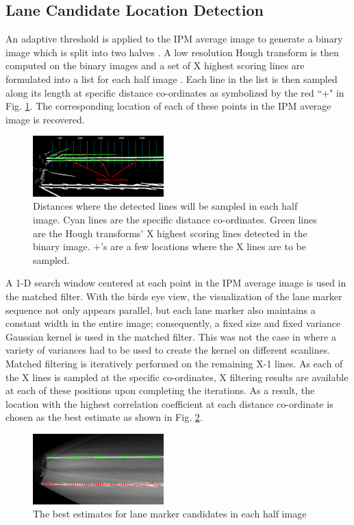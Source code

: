 \documentclass{article}
\begin{document}
\subsection{Lane Candidate Location Detection}
An adaptive threshold is applied to the IPM average image to generate a binary image which is split into two halves \cite{borkar_layered_2009}. A low resolution Hough transform is then computed on the binary images and a set of X highest scoring lines are formulated into a list for each half image \cite{borkar_layered_2009}. Each line in the list is then sampled along its length at specific distance co-ordinates as symbolized by the red ``+" in Fig. \ref{fig:sampling_points}.
The corresponding location of each of these points in the IPM average image is recovered.
\begin{figure}[htb]
  \centering
  \includegraphics[width=0.45\textwidth]{IMG/cand_lane_points.png}
  \caption{Distances where the detected lines will be sampled in each half image. Cyan lines are the specific distance co-ordinates. Green lines are the Hough transforms' X highest scoring lines detected in the binary image. +'s are a few locations where the X lines are to be sampled.}
  \label{fig:sampling_points}
\end{figure}
A 1-D search window centered at each point in the IPM average image is used in the matched filter. With the birds eye view, the visualization of the lane marker sequence not only appears parallel, but each lane marker also maintains a constant width in the entire image; consequently, a fixed size and fixed variance Gaussian kernel is used in the matched filter. This was not the case in \cite{borkar_layered_2009} where a variety of variances had to be used to create the kernel on different scanlines. Matched filtering is iteratively performed on the remaining X-1 lines. As each of the X lines is sampled at the specific co-ordinates, X filtering results are available at each of these positions upon completing the iterations. As a result, the location with the highest correlation coefficient at each distance co-ordinate is chosen as the best estimate as shown in Fig. \ref{fig:cand_pts}.
\begin{figure}[htb]
  \centering
  \includegraphics[width=0.45\textwidth]{IMG/cand_lane_points2.png}
  \caption{The best estimates for lane marker candidates in each half image}
  \label{fig:cand_pts}
\end{figure}
\end{document}
